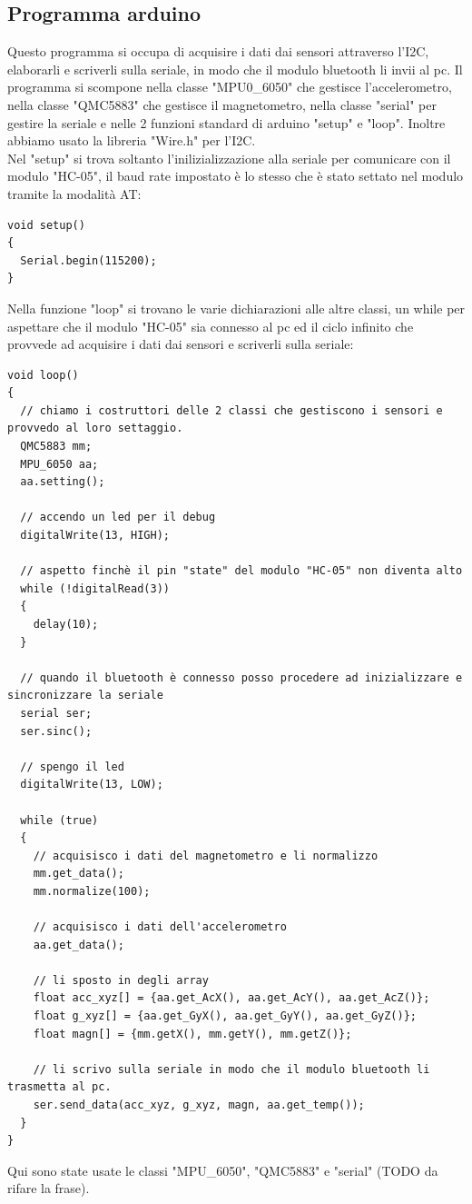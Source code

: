 \documentclass[10pt,a4paper]{article}
\begin{document}
\subsection{Programma arduino}
Questo programma si occupa di acquisire i dati dai sensori attraverso l'I2C, elaborarli e scriverli sulla seriale, in modo che il modulo bluetooth li invii al pc. Il programma si scompone nella classe "MPU0\_6050" che gestisce l'accelerometro, nella classe "QMC5883" che gestisce il magnetometro, nella classe "serial" per gestire la seriale e nelle 2 funzioni standard di arduino "setup" e "loop". Inoltre abbiamo usato la libreria "Wire.h" per l'I2C. \\
Nel "setup" si trova soltanto l'inilizializzazione alla seriale per comunicare con il modulo "HC-05", il baud rate impostato \`e lo stesso che \`e stato settato nel modulo tramite la modalit\`a AT:
\begin{lstlisting}[style=myArduino, caption=funzione "setup", captionpos=b]
void setup() 
{
  Serial.begin(115200);
}
\end{lstlisting}
Nella funzione "loop" si trovano le varie dichiarazioni alle altre classi, un while per aspettare che il modulo "HC-05" sia connesso al pc ed il ciclo infinito che provvede ad acquisire i dati dai sensori e scriverli sulla seriale:
\begin{lstlisting}[style=myArduino, caption=funzione "loop", captionpos=b]
void loop() 
{
  // chiamo i costruttori delle 2 classi che gestiscono i sensori e provvedo al loro settaggio.
  QMC5883 mm;
  MPU_6050 aa;
  aa.setting();

  // accendo un led per il debug  
  digitalWrite(13, HIGH);
  
  // aspetto finchè il pin "state" del modulo "HC-05" non diventa alto
  while (!digitalRead(3))
  {
    delay(10);
  }
  
  // quando il bluetooth è connesso posso procedere ad inizializzare e sincronizzare la seriale
  serial ser; 
  ser.sinc(); 

  // spengo il led
  digitalWrite(13, LOW);
  
  while (true)
  {
    // acquisisco i dati del magnetometro e li normalizzo
    mm.get_data();
    mm.normalize(100);
    
    // acquisisco i dati dell'accelerometro
    aa.get_data();

    // li sposto in degli array
    float acc_xyz[] = {aa.get_AcX(), aa.get_AcY(), aa.get_AcZ()};
    float g_xyz[] = {aa.get_GyX(), aa.get_GyY(), aa.get_GyZ()};
    float magn[] = {mm.getX(), mm.getY(), mm.getZ()};

    // li scrivo sulla seriale in modo che il modulo bluetooth li trasmetta al pc.
    ser.send_data(acc_xyz, g_xyz, magn, aa.get_temp());
  }
}
\end{lstlisting}
Qui sono state usate le classi "MPU\_6050", "QMC5883" e "serial" (TODO da rifare la frase).
\end{document}
